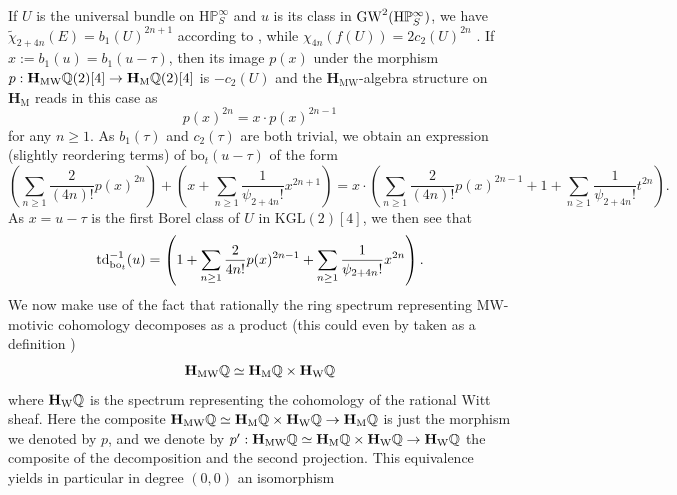 If $U$ is the universal bundle on $\mathrm{H}\mathbb{P}^{\infty}_S$ and $u$ is its class in $\operatorname{GW}^2(\mathrm{H}\mathbb{P}^{\infty}_S)$, we have $\tilde \chi_{2+4n}(E)=b_1(U)^{2n+1}$ according to \cite[\S 4.1.7]{DF3}, while $\chi_{4n}(f(U))=2c_2(U)^{2n}$ \cite[Lemma 4.3.4]{DF3}. If $x:=b_1(u)=b_1(u-\tau)$, then its image $p(x)$ under the  morphism $p:\mathbf{H}_\mathrm{MW}\mathbb{Q}(2)[4]\to \mathbf{H}_\mathrm{M}\mathbb{Q}(2)[4]$ is $-c_2(U)$ and the $\mathbf{H}_\mathrm{MW}$-algebra structure on $\mathbf{H}_\mathrm{M}$ reads in this case as 
\[
p(x)^{2n}=x\cdot p(x)^{2n-1}
\] 
for any $n\geq 1$. As $b_1(\tau)$ and $c_2(\tau)$ are both trivial, we obtain an expression (slightly reordering terms) of $\mathrm{bo}_t(u-\tau)$ of the form
\[
\left(\sum_{n\geq 1}\frac 2{(4n)!}p(x)^{2n}\right )+\left( x+\sum_{n\geq 1}\frac 1{\psi_{2+4n}!} x^{2n+1}\right)=x\cdot \left(\sum_{n\geq 1}\frac 2{(4n)!}p(x)^{2n-1}+ 1 +\sum_{n\geq 1}\frac 1{\psi_{2+4n}!} t^{2n}\right).
\]
As $x=u-\tau$ is the first Borel class of $U$ in $\mathrm{KGL}(2)[4]$, we then see that 
\[
\operatorname{td}_{\mathrm{bo}_t}^{-1}(u)=\left(1+\sum_{n\geq 1}\frac 2{4n!}p(x)^{2n-1}+\sum_{n\geq 1}\frac 1{\psi_{2+4n}!} x^{2n}\right).
\]
We now make use of the fact that rationally the ring spectrum representing MW-motivic cohomology decomposes as a product (this could even by taken as a definition \cite[\S 5, \S 6]{DFJK})
\[
\mathbf{H}_\mathrm{MW}\mathbb{Q}\simeq \mathbf{H}_\mathrm{M}\mathbb{Q}\times \mathbf{H}_\mathrm{W}\mathbb{Q}
\]
where $ \mathbf{H}_\mathrm{W}\mathbb{Q}$ is the spectrum representing the cohomology of the rational Witt sheaf. Here the composite $\mathbf{H}_\mathrm{MW}\mathbb{Q}\simeq \mathbf{H}_\mathrm{M}\mathbb{Q}\times \mathbf{H}_\mathrm{W}\mathbb{Q}\to \mathbf{H}_\mathrm{M}\mathbb{Q}$ is just the morphism we denoted by $p$, and we denote by $p':\mathbf{H}_\mathrm{MW}\mathbb{Q}\simeq \mathbf{H}_\mathrm{M}\mathbb{Q}\times \mathbf{H}_\mathrm{W}\mathbb{Q}\to \mathbf{H}_\mathrm{W}\mathbb{Q}$ the composite of the decomposition and the second projection. This equivalence yields in particular in degree $(0,0)$ an isomorphism 

